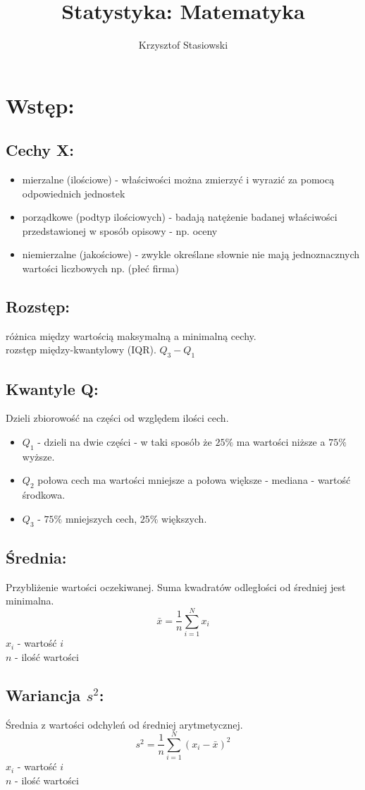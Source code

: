 \documentclass[fleqn,a4paper]{article}
\title{Statystyka: Matematyka}
\author{Krzysztof Stasiowski}
\date{}
\begin{document}
\section{Wstęp:}
\subsection{Cechy X:}
\begin{itemize}
\item mierzalne (ilościowe) - właściwości można zmierzyć i wyrazić za pomocą odpowiednich jednostek
\item porządkowe (podtyp ilościowych) - badają natężenie badanej właściwości przedstawionej w sposób opisowy - np. oceny 
\item niemierzalne (jakościowe) - zwykle określane słownie nie mają jednoznacznych wartości liczbowych np. (płeć firma)
\end{itemize}

\subsection{Rozstęp:}
różnica między wartością maksymalną a minimalną cechy.\\
rozstęp między-kwantylowy (IQR). $Q_3-Q_1$

\subsection{Kwantyle Q:}
Dzieli zbiorowość na części od względem ilości cech. 
\begin{itemize}
\item
$Q_1$ - dzieli na dwie części - w taki sposób że $25\%$ ma wartości niższe a $75\%$ wyższe.
\item
$Q_2$ połowa cech ma wartości mniejsze a połowa większe - mediana - wartość środkowa.  
\item
$Q_3$ - $75\%$ mniejszych cech, $25\%$ większych.
\end{itemize}

\subsection{Średnia:}
Przybliżenie wartości oczekiwanej. Suma kwadratów odległości od średniej jest minimalna.
\[\bar{x} = \frac{1}{n}\sum_{i=1}^Nx_i\]
$x_i$ - wartość $i$\\
$n$ - ilość wartości

\subsection{Wariancja \texorpdfstring{\(s^2\)}{V(X)}:}
Średnia z wartości odchyleń od średniej arytmetycznej.
\[s^2 = \frac{1}{n}\sum_{i=1}^N(x_i-\bar{x})^2\]
$x_i$ - wartość $i$\\
$n$ - ilość wartości
\end{document}
